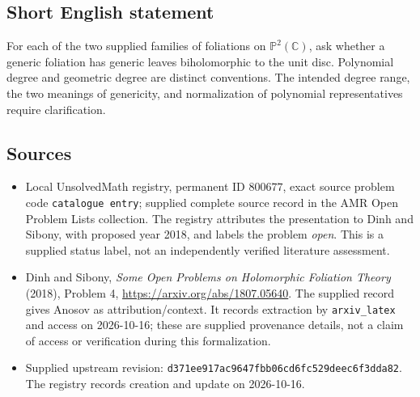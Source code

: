 \documentclass[11pt]{article}
\newcommand{\C}{\mathbb{C}}
\begin{document}
\subsection{Short English statement}
For each of the two supplied families of foliations on \(\mathbb P^2(\C)\), ask whether a generic foliation has generic leaves biholomorphic to the unit disc. Polynomial degree and geometric degree are distinct conventions. The intended degree range, the two meanings of genericity, and normalization of polynomial representatives require clarification.
\subsection{Sources}
\begin{itemize}
\item Local UnsolvedMath registry, permanent ID \(800677\), exact source problem code \texttt{catalogue entry}; supplied complete source record in the AMR Open Problem Lists collection. The registry attributes the presentation to Dinh and Sibony, with proposed year 2018, and labels the problem \emph{open}. This is a supplied status label, not an independently verified literature assessment.
\item Dinh and Sibony, \emph{Some Open Problems on Holomorphic Foliation Theory} (2018), Problem 4, \url{https://arxiv.org/abs/1807.05640}. The supplied record gives Anosov as attribution/context. It records extraction by \texttt{arxiv\_latex} and access on 2026-10-16; these are supplied provenance details, not a claim of access or verification during this formalization.
\item Supplied upstream revision: \texttt{d371ee917ac9647fbb06cd6fc529deec6f3dda82}. The registry records creation and update on 2026-10-16.
\end{itemize}
\end{document}
